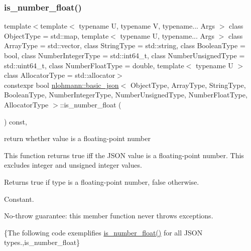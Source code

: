\subsubsection{\texorpdfstring{is\+\_\+number\+\_\+float()}{is\_number\_float()}}
{\footnotesize\ttfamily template$<$template$<$ typename U, typename V, typename... Args $>$ class Object\+Type = std\+::map, template$<$ typename U, typename... Args $>$ class Array\+Type = std\+::vector, class String\+Type  = std\+::string, class Boolean\+Type  = bool, class Number\+Integer\+Type  = std\+::int64\+\_\+t, class Number\+Unsigned\+Type  = std\+::uint64\+\_\+t, class Number\+Float\+Type  = double, template$<$ typename U $>$ class Allocator\+Type = std\+::allocator$>$ \\
constexpr bool \hyperlink{classnlohmann_1_1basic__json}{nlohmann\+::basic\+\_\+json}$<$ Object\+Type, Array\+Type, String\+Type, Boolean\+Type, Number\+Integer\+Type, Number\+Unsigned\+Type, Number\+Float\+Type, Allocator\+Type $>$\+::is\+\_\+number\+\_\+float (\begin{DoxyParamCaption}{ }\end{DoxyParamCaption}) const\hspace{0.3cm}{\ttfamily [inline]}, {\ttfamily [noexcept]}}



return whether value is a floating-\/point number 

This function returns true iff the J\+S\+ON value is a floating-\/point number. This excludes integer and unsigned integer values.

\begin{DoxyReturn}{Returns}
{\ttfamily true} if type is a floating-\/point number, {\ttfamily false} otherwise.
\end{DoxyReturn}
Constant.

No-\/throw guarantee\+: this member function never throws exceptions.

\{The following code exemplifies {\ttfamily \hyperlink{classnlohmann_1_1basic__json_a7641371be8a347f3c1e05ac089a74c36}{is\+\_\+number\+\_\+float()}} for all J\+S\+ON types.,is\+\_\+number\+\_\+float\}

